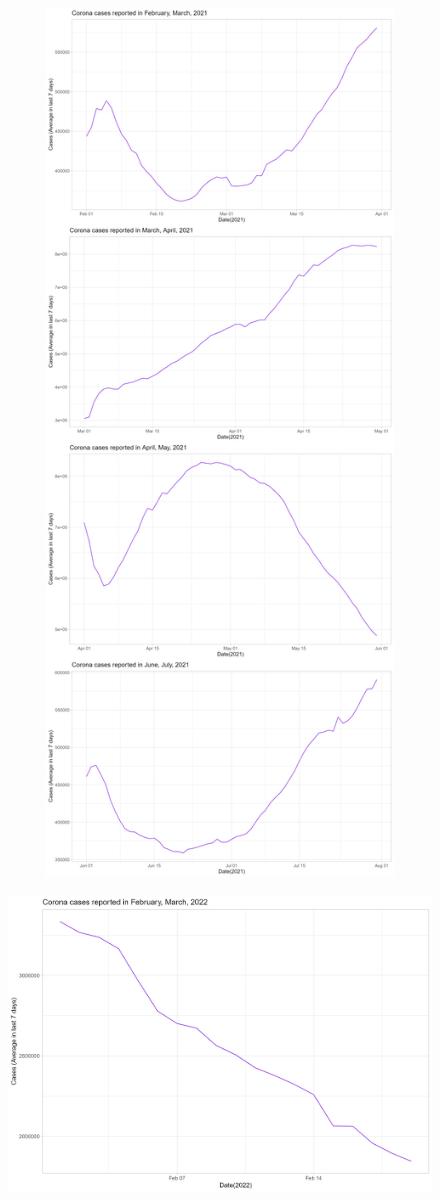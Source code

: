 \documentclass[a4paper]{article}
\theoremstyle{definition}
\begin{document}
\begin{enumerate}[i)]
\begin{enumerate}[1)]
\begin{figure}[H]
				\includegraphics[height=23cm,width=13cm]{images/8.3.2.png}
			\end{figure}
			\begin{figure}[H]
				\centering
				\includegraphics[scale=0.2]{images/8.3.3.png}

\end{figure}
\end{enumerate}
\end{enumerate}
\end{document}
